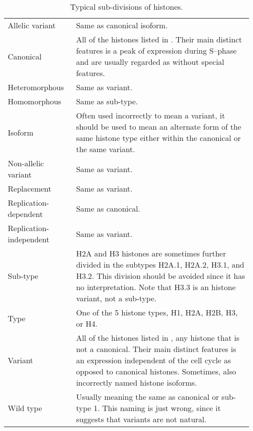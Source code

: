   \begin{table*}
    \caption{Typical sub-divisions of histones.}
    \label{tab:histone-divisions}
    \centering
    \begin{tabular}{F p{\dimexpr(\textwidth--4\tabcolsep)}}
      \toprule
      Allelic variant & Same as canonical isoform. \\
      Canonical &   All of the histones listed in .
                    Their main distinct features is a peak of expression during
                    S--phase and are usually regarded as without special
                    features. \\
      \addlinespace
      Heteromorphous & Same as variant. \\
      \addlinespace
      Homomorphous & Same as sub-type. \\
      \addlinespace
      Isoform   &   Often used incorrectly to mean a variant, it should be
                    used to mean an alternate form of the same histone type
                    either within the canonical or the same variant. \\
      \addlinespace
      Non-allelic variant & Same as variant. \\
      \addlinespace
      Replacement & Same as variant. \\
      \addlinespace
      Replication-dependent & Same as canonical. \\
      \addlinespace
      Replication-independent & Same as variant. \\
      \addlinespace
      Sub-type  &   H2A and H3 histones are sometimes further divided in the
                    subtypes H2A.1, H2A.2, H3.1, and H3.2. This division should
                    be avoided since it has no interpretation. Note that H3.3
                    is an histone variant, not a sub-type. \\
      \addlinespace
      Type      &   One of the 5 histone types, H1, H2A, H2B, H3, or H4.\\
      \addlinespace
      Variant   &   All of the histones listed in ,
                    any histone that is not a canonical. Their main distinct
                    features is an expression independent of the cell cycle as
                    opposed to canonical histones. Sometimes, also incorrectly
                    named histone isoforms. \\
      \addlinespace
      Wild type &   Usually meaning the same as canonical or sub-type 1. This
                    naming is just wrong, since it suggests that variants are
                    not natural. \\
      \bottomrule
    \end{tabular}
  \end{table*}

